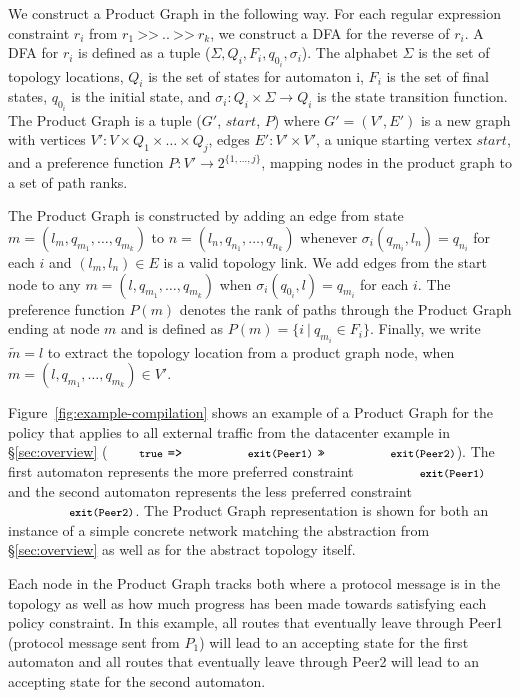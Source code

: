 \documentclass[numbers, 10pt, preprint]{sigplanconf}
\newcommand{\set}[1]{\ensuremath{\{ #1 \} }}
\newcommand{\CD}[1]{\texttt{\small #1}}  %
\newcommand{\KW}[1]{\texttt{\small\bfseries{#1}}}
\newcommand{\True}{\CD{true}}
\newcommand{\Prefer}{\texttt{>>}}
\newcommand{\Path}{\texttt{=>}}
\newcommand{\Exit}{\KW{exit}}
\begin{document}
We construct a Product Graph in the following way. For each regular expression constraint $r_i$ from $r_1 ~\Prefer~ .. ~\Prefer~ r_k$, we construct a DFA for the reverse of $r_i$. A DFA for $r_i$ is defined as a tuple ($\Sigma, Q_i, F_i, q_{0_i}, \sigma_i$). The alphabet $\Sigma$ is the set of topology locations, $Q_i$ is the set of states for automaton i, $F_i$ is the set of final states, $q_{0_i}$ is the initial state, and $\sigma_i \colon Q_i \times \Sigma \rightarrow Q_i$ is the state transition function.
%
The Product Graph is a tuple ($G'$, $start$, $P$) where $G' = (V',E')$ is a new graph with
vertices $V' \colon V \times Q_1 \times \dots \times Q_j$,
edges $E' \colon V' \times V'$,
a unique starting vertex $start$,
and a preference function $P \colon V' \rightarrow 2^{\set{1, \dots, j}}$, mapping nodes in the product graph to a set of path ranks.

The Product Graph is constructed by adding an edge from state $m = (l_m, q_{m_1}, \dots, q_{m_k})$ to $n = (l_n, q_{n_1}, \dots, q_{n_k})$ whenever $\sigma_i(q_{m_i}, l_n) = q_{n_i}$ for each $i$ and $(l_m,l_n) \in E$ is a valid topology link.
%
We add edges from the start node to any $m = (l, q_{m_1}, \dots, q_{m_k})$ when $\sigma_i(q_{0_i}, l) = q_{m_i}$ for each $i$.
%
The preference function $P(m)$ denotes the rank of paths through the Product Graph ending at node $m$ and is defined as $P(m) = \set{i~\vert~q_{m_i} \in F_i}$.
%
Finally, we write $\tilde{m} = l$ to extract the topology location from a product graph node, when $m = (l, q_{m_1}, \dots, q_{m_k}) \in V'$.

Figure~\ref{fig:example-compilation} shows an example of a Product Graph for the policy that applies to all external traffic from the datacenter example in \S\ref{sec:overview} ($\True ~\Path~ \CD{\Exit(Peer1)} ~\Prefer~ \CD{\Exit(Peer2)}$).
%
%
The first automaton represents the more preferred constraint $\CD{\Exit(Peer1)}$ and the second automaton represents the less preferred constraint $\CD{\Exit(Peer2)}$. The Product Graph representation is shown for both an instance of a simple concrete network matching the abstraction from \S\ref{sec:overview} as well as for the abstract topology itself.

Each node in the Product Graph tracks both where a protocol message is in the topology as well as how much progress has been made towards satisfying each policy constraint. In this example, all routes that eventually leave through Peer1 (protocol message sent from $P_1$) will lead to an accepting state for the first automaton and all routes that eventually leave through Peer2 will lead to an accepting state for the second automaton.
\end{document}
